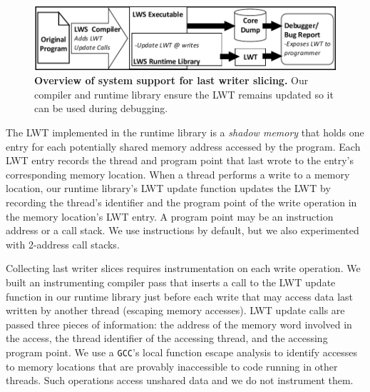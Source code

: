 \documentclass[preprint,10pt]{sigplanconf}
\newcommand{\lwt}{LWT\xspace}
\begin{document}
\begin{figure}[h]
\centering
\includegraphics[width=.9\columnwidth]{figs/LWS_Overview.pdf}
\caption{\label{fig:lwsoverview}{\bf Overview of system support for last writer slicing.} Our compiler and runtime library ensure the \lwt remains updated so it can be used during debugging.}
\end{figure}

The \lwt implemented in the runtime library is a {\em shadow memory} that holds
one entry for each potentially shared memory address accessed by the program.
Each \lwt entry records the thread and program point that last wrote to the
entry's corresponding memory location.  When a thread performs a write to a
memory location, our runtime library's \lwt update function updates the \lwt by
recording the thread's identifier and the program point of the write operation
in the memory location's \lwt entry.  A program point may be an instruction
address or a call stack.  We use instructions by default, but we also experimented
with 2-address call stacks.   

Collecting last writer slices requires instrumentation on each write operation.
We built an instrumenting compiler pass that inserts a call to the \lwt update
function in our runtime library just before each write that may access data
last written by another thread (escaping memory accesses).  \lwt update 
calls are passed three pieces of information: the address of
the memory word involved in the access, the thread identifier of the accessing
thread, and the accessing program point.   We use a {\tt GCC}'s local function
escape analysis to identify accesses to memory locations that are provably
inaccessible to code running in other threads.  Such operations access unshared
data and we do not instrument them.  

\end{document}
